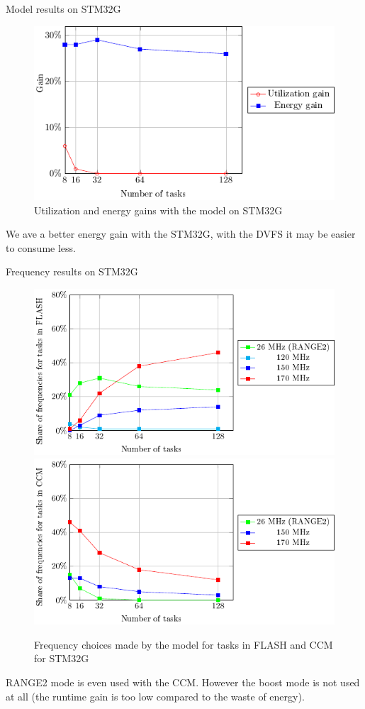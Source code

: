 \documentclass[
	11pt, %
]{beamer}
\begin{document}
\begin{frame}{Model results on STM32G}
	\begin{figure}
		\includegraphics{data/model/results_32g.pdf}
		\caption{Utilization and energy gains with the model on STM32G}
	\end{figure}
	We ave a better energy gain with the STM32G, with the DVFS it may be easier to consume less.
\end{frame}

\begin{frame}{Frequency results on STM32G}
	\begin{figure}
        \includegraphics[scale = 0.6]{data/model/f_choose_32g_flash.pdf}
		\includegraphics[scale = 0.6]{data/model/f_choose_32g_ccm.pdf}
		\caption{Frequency choices made by the model for tasks in FLASH and CCM for STM32G}
	\end{figure}
RANGE2 mode is even used with the CCM. 
However the boost mode is not used at all (the runtime gain is too low compared to the waste of energy).
\end{frame}
\end{document}
